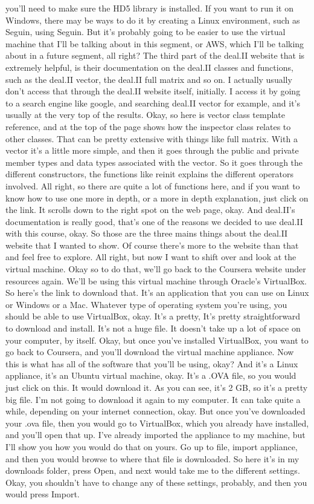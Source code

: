 \documentclass[10pt]{article}
\begin{document}
you'll need to make sure the HD5 library is installed. If you want to run it on Windows, there may be ways to do it by creating a Linux environment, such as Seguin, using Seguin. But it's probably going to be easier to use the virtual machine that I'll be talking about in this segment, or AWS, which I'll be talking about in a future segment, all right? The third part of the deal.II website that is extremely helpful, is their documentation on the deal.II classes and functions, such as the deal.II vector, the deal.II full matrix and so on. I actually usually don't access that through the deal.II website itself, initially. I access it by going to a search engine like google, and searching deal.II vector for example, and it's usually at the very top of the results. Okay, so here is vector class template reference, and at the top of the page shows how the inspector class relates to other classes. That can be pretty extensive with things like full matrix. With a vector it's a little more simple, and then it goes through the public and private member types and data types associated with the vector. So it goes through the different constructors, the functions like reinit explains the different operators involved. All right, so there are quite a lot of functions here, and if you want to know how to use one more in depth, or a more in depth explanation, just click on the link. It scrolls down to the right spot on the web page, okay. And deal.II's documentation is really good, that's one of the reasons we decided to use deal.II with this course, okay. So those are the three mains things about the deal.II website that I wanted to show. Of course there's more to the website than that and feel free to explore. All right, but now I want to shift over and look at the virtual machine. Okay so to do that, we'll go back to the Coursera website under resources again. We'll be using this virtual machine through Oracle's VirtualBox. So here's the link to download that. It's an application that you can use on Linux or Windows or a Mac. Whatever type of operating system you're using, you should be able to use VirtualBox, okay. It's a pretty, It's pretty straightforward to download and install. It's not a huge file. It doesn't take up a lot of space on your computer, by itself. Okay, but once you've installed VirtualBox, you want to go back to Coursera, and you'll download the virtual machine appliance. Now this is what has all of the software that you'll be using, okay? And it's a Linux appliance, it's an Ubuntu virtual machine, okay. It's a .OVA file, so you would just click on this. It would download it. As you can see, it's 2 GB, so it's a pretty big file. I'm not going to download it again to my computer. It can take quite a while, depending on your internet connection, okay. But once you've downloaded your .ova file, then you would go to VirtualBox, which you already have installed, and you'll open that up. I've already imported the appliance to my machine, but I'll show you how you would do that on yours. Go up to file, import appliance, and then you would browse to where that file is downloaded. So here it's in my downloads folder, press Open, and next would take me to the different settings. Okay, you shouldn't have to change any of these settings, probably, and then you would press Import. 
\end{document}
